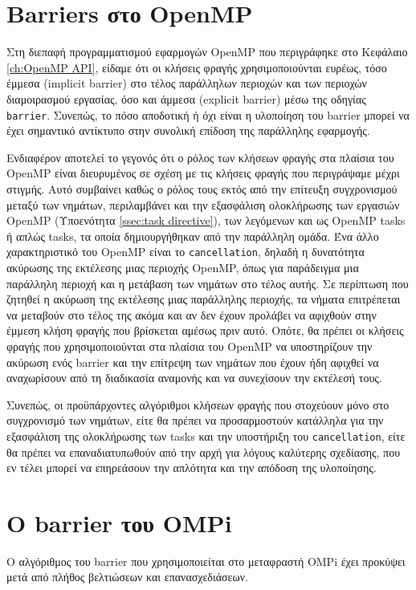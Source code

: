 \section{Barriers στο OpenMP}
\label{sec:Barriers in OpenMP}
Στη διεπαφή προγραμματισμού εφαρμογών OpenMP που περιγράφηκε στο Κεφάλαιο \ref{ch:OpenMP API}, είδαμε ότι οι κλήσεις φραγής χρησιμοποιούνται ευρέως, τόσο έμμεσα (implicit barrier) στο τέλος παράλληλων περιοχών και των περιοχών διαμοιρασμού εργασίας, όσο και άμμεσα (explicit barrier) μέσω της οδηγίας \texttt{barrier}. Συνεπώς, το πόσο αποδοτική ή όχι είναι η υλοποίηση του barrier μπορεί να έχει σημαντικό αντίκτυπο στην συνολική επίδοση της παράλληλης εφαρμογής. %

Ενδιαφέρον αποτελεί το γεγονός ότι ο ρόλος των κλήσεων φραγής στα πλαίσια του OpenMP είναι διευρυμένος σε σχέση με τις κλήσεις φραγής που περιγράψαμε μέχρι στιγμής. Αυτό συμβαίνει καθώς ο ρόλος τους εκτός από την επίτευξη συγχρονισμού μεταξύ των νημάτων, περιλαμβάνει και την εξασφάλιση ολοκλήρωσης των εργασιών OpenMP (Υποενότητα \ref{ssec:task directive}), των λεγόμενων και ως OpenMP tasks ή απλώς tasks, τα οποία δημιουργήθηκαν από την παράλληλη ομάδα. Ένα άλλο χαρακτηριστικό του OpenMP είναι το \texttt{cancellation}, δηλαδή η δυνατότητα ακύρωσης της εκτέλεσης μιας περιοχής OpenMP, όπως για παράδειγμα μια παράλληλη περιοχή και η μετάβαση των νημάτων στο τέλος αυτής. Σε περίπτωση που ζητηθεί η ακύρωση της εκτέλεσης μιας παράλληλης περιοχής, τα νήματα επιτρέπεται να μεταβούν στο τέλος της ακόμα και αν δεν έχουν προλάβει να αφιχθούν στην έμμεση κλήση φραγής που βρίσκεται αμέσως πριν αυτό. Οπότε, θα πρέπει οι κλήσεις φραγής που χρησιμοποιούνται στα πλαίσια του OpenMP να υποστηρίζουν την ακύρωση ενός barrier και την επίτρεψη των νημάτων που έχουν ήδη αφιχθεί να αναχωρίσουν από τη διαδικασία αναμονής και να συνεχίσουν την εκτέλεσή τους.

Συνεπώς, οι προϋπάρχοντες αλγόριθμοι κλήσεων φραγής που στοχεύουν μόνο στο συγχρονισμό των νημάτων, είτε θα πρέπει να προσαρμοστούν κατάλληλα για την εξασφάλιση της ολοκλήρωσης των tasks και την υποστήριξη του \texttt{cancellation}, είτε θα πρέπει να επαναδιατυπωθούν από την αρχή για λόγους καλύτερης σχεδίασης, που εν τέλει μπορεί να επηρεάσουν την απλότητα και την απόδοση της υλοποίησης.

\section{Ο barrier του OMPi}
\label{sec:OMPi's barrier}
Ο αλγόριθμος του barrier που χρησιμοποιείται στο μεταφραστή OMPi έχει προκύψει μετά από πλήθος βελτιώσεων και επανασχεδιάσεων.

